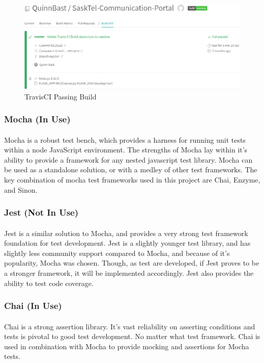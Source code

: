 \documentclass[12pt]{article}
\begin{document}
	\begin{figure}[h]
	\includegraphics[width=\textwidth]{TravisCI.png}
	\caption{TravisCI Passing Build}
	\end{figure}
	\newpage

\subsubsection{Mocha (In Use)}
\paragraph{}	Mocha is a robust test bench, which provides a harness for running unit tests within a node JavaScript environment. The strengths of Mocha lay within it's ability to provide a framework for any nested javascript test library. Mocha can be used as a standalone solution, or with a medley of other test frameworks. The key combination of mocha test frameworks used in this project are Chai, Enzyme, and Sinon.
 
\subsubsection{Jest (Not In Use)}
\paragraph{}	 Jest is a similar solution to Mocha, and provides a very strong test framework foundation for test development. Jest is a slightly younger test library, and has slightly less community support compared to Mocha, and because of it's popularity, Mocha was chosen. Though, as test are developed, if Jest proves to be a stronger framework, it will be implemented accordingly. Jest also provides the ability to test code coverage. 
\subsubsection{Chai (In Use)}
\paragraph{}	Chai is a strong assertion library. It's vast reliability on asserting conditions and tests is pivotal to good test development. No matter what test framework. Chai is used in combination with Mocha to provide mocking and assertions for Mocha tests.
\end{document}
